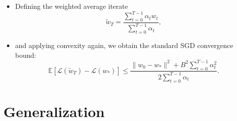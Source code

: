 \documentclass[a4paper]{article}
\begin{document}
\begin{itemize}
\begin{itemize}
\begin{itemize}
                    \item Defining the weighted average iterate
                        $$\tilde{w}_T = \frac{\sum_{t=0}^{T-1}\alpha_t w_t}{\sum_{t=0}^{T-1}\alpha_t},$$
                    \item and applying convexity again, we obtain the standard SGD convergence bound:
                        $$ \mathbb{E}[\mathcal{L}(\tilde{w}_T) - \mathcal{L}(w_*)] \le
                \frac{\|w_0 - w_*\|^2 + B^2 \sum_{t=0}^{T-1}\alpha_t^2} {2 \sum_{t=0}^{T-1}\alpha_t}.$$
                \end{itemize}

        \end{itemize}
\end{itemize}

\section{Generalization}
\end{document}
